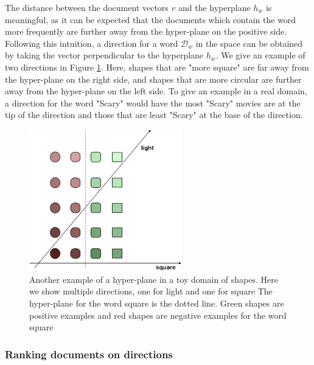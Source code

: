 The distance between the document vectors $v$ and the hyperplane $h_w$ is  meaningful, as it can be expected that the documents which contain the word more frequently are  further away from the hyper-plane on the positive side. Following this intuition, a direction for a word $\mathcal{D}_w$ in the space can be obtained by taking the vector perpendicular to the hyperplane $h_w $. We give an example of two directions in Figure \ref{ch3:ToyHyperPlane}. Here, shapes that are "more square" are far away from the hyper-plane on the right side, and  shapes that are more circular are further away from the hyper-plane on the left side. To  give an example in a real domain, a direction for the word "Scary" would have the most "Scary" movies are at the tip of the direction and those that are least "Scary"  at the base of the direction. %
\begin{figure}[t]
	\includegraphics[width=250px]{images/ToyHyperplane.png}
	\centering
	\caption{Another example of a hyper-plane in a toy domain of shapes. Here we show multiple directions, one for light and one for square The hyper-plane for the word square is the dotted line. Green shapes are positive examples and red shapes are negative examples for the word square}\label{ch3:ToyHyperPlane}
\end{figure}

\subsubsection{Ranking documents on directions}\label{ch3:rankingdocuments}

